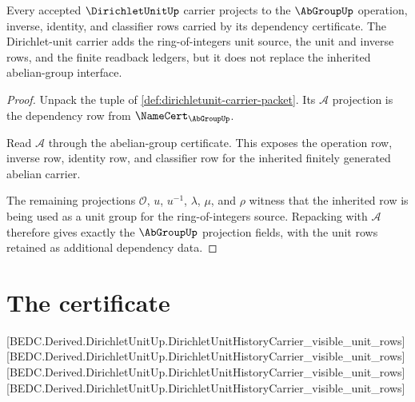 \begin{theorem}
\label{thm:dirichletunit-unit-abgroup-projection}
Every accepted $\DirichletUnitUp$ carrier projects to the $\AbGroupUp$
operation, inverse, identity, and classifier rows carried by its dependency
certificate. The Dirichlet-unit carrier adds the ring-of-integers unit source,
the unit and inverse rows, and the finite readback ledgers, but it does not
replace the inherited abelian-group interface.
\end{theorem}
\begin{proof}
Unpack the tuple of \autoref{def:dirichletunit-carrier-packet}. Its
$\mathcal{A}$ projection is the dependency row from
$\NameCert_{\AbGroupUp}$.

Read $\mathcal{A}$ through the abelian-group certificate. This exposes the
operation row, inverse row, identity row, and classifier row for the inherited
finitely generated abelian carrier.

The remaining projections $\mathcal{O}$, $u$, $u^{-1}$, $\lambda$, $\mu$, and
$\rho$ witness that the inherited row is being used as a unit group for the
ring-of-integers source. Repacking with $\mathcal{A}$ therefore gives exactly
the $\AbGroupUp$ projection fields, with the unit rows retained as additional
dependency data.
\end{proof}

\section{The certificate}
\label{sec:dirichletunit-certificate}
[BEDC.Derived.DirichletUnitUp.DirichletUnitHistoryCarrier\_visible\_unit\_rows]
[BEDC.Derived.DirichletUnitUp.DirichletUnitHistoryCarrier\_visible\_unit\_rows]
[BEDC.Derived.DirichletUnitUp.DirichletUnitHistoryCarrier\_visible\_unit\_rows]
[BEDC.Derived.DirichletUnitUp.DirichletUnitHistoryCarrier\_visible\_unit\_rows]

